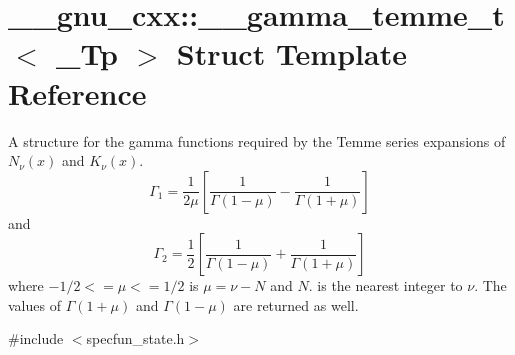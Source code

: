 \hypertarget{struct____gnu__cxx_1_1____gamma__temme__t}{}\section{\+\_\+\+\_\+gnu\+\_\+cxx\+:\+:\+\_\+\+\_\+gamma\+\_\+temme\+\_\+t$<$ \+\_\+\+Tp $>$ Struct Template Reference}
\label{struct____gnu__cxx_1_1____gamma__temme__t}


A structure for the gamma functions required by the Temme series expansions of $ N_\nu(x) $ and $ K_\nu(x) $. \[ \Gamma_1 = \frac{1}{2\mu} \left[\frac{1}{\Gamma(1 - \mu)} - \frac{1}{\Gamma(1 + \mu)}\right] \] and \[ \Gamma_2 = \frac{1}{2} \left[\frac{1}{\Gamma(1 - \mu)} + \frac{1}{\Gamma(1 + \mu)}\right] \] where $ -1/2 <= \mu <= 1/2 $ is $ \mu = \nu - N $ and $ N $. is the nearest integer to $ \nu $. The values of $ \Gamma(1 + \mu) $ and $ \Gamma(1 - \mu) $ are returned as well.  




{\ttfamily \#include $<$specfun\+\_\+state.\+h$>$}

